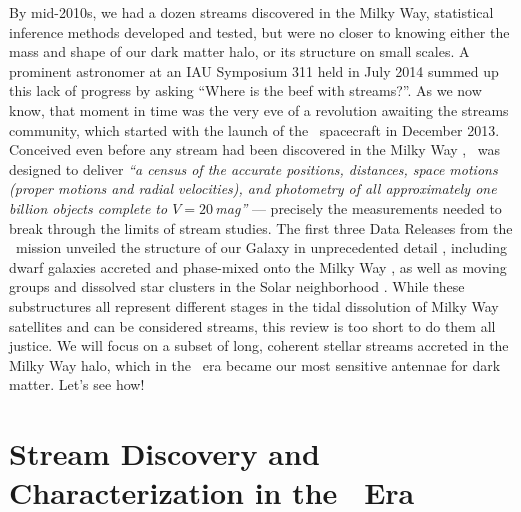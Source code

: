 \documentclass[final,5p,times,twocolumn,authoryear]{elsarticle}
\begin{document}
By mid-2010s, we had a dozen streams discovered in the Milky Way, statistical inference methods developed and tested, but were no closer to knowing either the mass and shape of our dark matter halo, or its structure on small scales.
A prominent astronomer at an IAU Symposium 311 held in July 2014 summed up this lack of progress by asking ``Where is the beef with streams?''.
As we now know, that moment in time was the very eve of a revolution awaiting the streams community, which started with the launch of the \gaia\ spacecraft in December 2013.
Conceived even before any stream had been discovered in the Milky Way \citep{lindegren:1993, battrick:1994, lindegren:1996}, \gaia\ was designed to deliver \emph{``a census of the accurate positions, distances, space motions (proper motions and radial velocities), and photometry of all approximately one billion objects complete to $V=20$\,mag''} \citep{perryman:2001} --- precisely the measurements needed to break through the limits of stream studies.
The first three Data Releases from the \gaia\ mission unveiled the structure of our Galaxy in unprecedented detail \citep{babusiaux:2018, helmi:2018, katz:2018, antoja:2021, smart:2021, drimmel:2023, schultheis:2023}, including dwarf galaxies accreted and phase-mixed onto the Milky Way \citep{belokurov:2018, helmi:2018b, myeong:2019, naidu:2020}, as well as moving groups and dissolved star clusters in the Solar neighborhood \citep{antoja:2018, kawata:2018, ramos:2018, meingast:2019, roser:2019}.
While these substructures all represent different stages in the tidal dissolution of Milky Way satellites and can be considered streams, this review is too short to do them all justice.
We will focus on a subset of long, coherent stellar streams accreted in the Milky Way halo, which in the \gaia\ era became our most sensitive antennae for dark matter.
Let's see how!


\section{Stream Discovery and Characterization in the \gaia\ Era}
\label{sec:discovery}

\end{document}

